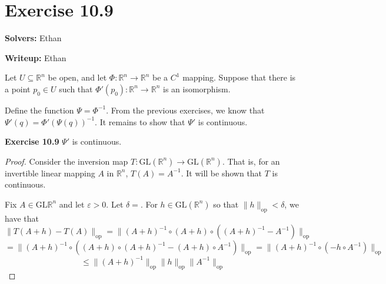 \documentclass{article}
\newcommand{\op}{\mathrm{op}}
\newcommand{\GL}{\mathrm{GL}}
\theoremstyle{plain} %
\numberwithin{thm}{section} %
\theoremstyle{definition}
\begin{document}
    \section*{Exercise 10.9}
    \textbf{Solvers:} Ethan

    \noindent\textbf{Writeup:} Ethan

    Let \(U \subseteq \mathbb{R}^n\) be open, and let \(\Phi : \mathbb{R}^n \to \mathbb{R}^n\) be a \(C^1\) mapping. Suppose that there is a point \(p_0 \in U\) such that \(\Phi '(p_0) : \mathbb{R}^n \to \mathbb{R}^n\) is an isomorphism.

    \medskip

    Define the function \(\Psi = \Phi ^{-1}\). From the previous exercises, we know that \(\Psi '(q) = \Phi '(\Psi (q)) ^{-1}\). It remains to show that \(\Psi '\) is continuous.

    \noindent\textbf{Exercise 10.9} \(\Psi '\) is continuous.

    \begin{proof}
        Consider the inversion map \(T : \GL(\mathbb{R}^n) \to \GL(\mathbb{R}^n)\). That is, for an invertible linear mapping \(A\) in \(\mathbb{R}^n\), \(T(A) = A^{-1}\). It will be shown that \(T\) is continuous.

        Fix \(A \in \GL{\mathbb{R}^n}\) and let \(\varepsilon > 0\). Let \(\delta = \). For \(h \in \GL(\mathbb{R}^n)\) so that \(\|h\| _{\op} < \delta\), we have that
        \[
            \|T(A + h) - T(A)\|_{\op} = \|(A+h)^{-1} \circ (A+h) \circ ((A+h)^{-1} - A^{-1})\|_{\op}
        \]
        \[
            = \|(A+h)^{-1} \circ ((A+h)\circ (A+h)^{-1} - (A+h) \circ A^{-1})\|_{\op} = \|(A+h)^{-1} \circ (- h \circ A^{-1})\|_{\op}
        \]
        \[
            \leq \|(A+h)^{-1}\|_{\op} \|h\|_{\op} \|A^{-1}\|_{\op}
        \]
    \end{proof}
\end{document}
